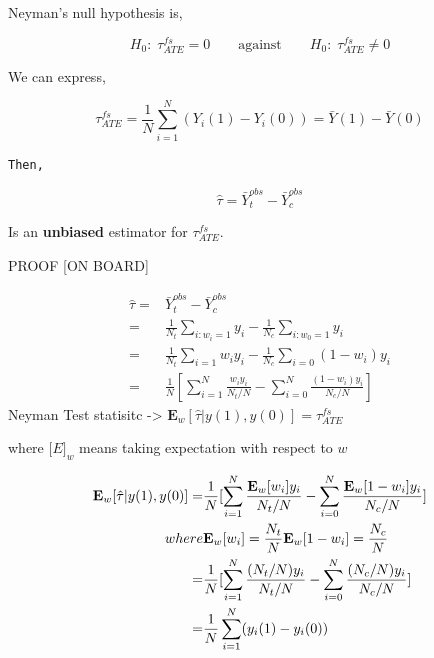 \documentclass[
  letterpaper,
  DIV=11,
  numbers=noendperiod]{scrreprt}
\theoremstyle{definition}
\theoremstyle{remark}
\begin{document}
Neyman's null hypothesis is,

\par

\[
H_0:\;\tau^{fs}_{ATE} = 0 \qquad\text{against}\qquad H_0:\;\tau^{fs}_{ATE} \neq 0
\]

We can express,

\[
        \tau^{fs}_{ATE} = \frac{1}{N}\sum_{i=1}^{N}(Y_i(1)-Y_i(0))=\bar{Y}(1)-\bar{Y}(0)
\]

\begin{verbatim}
Then, 
\end{verbatim}

\[
        \hat{\tau} = \bar{Y}^{obs}_t-\bar{Y}^{obs}_c
\]

Is an \textbf{unbiased} estimator for \(\tau^{fs}_{ATE}\).

PROOF {[}ON BOARD{]}

\begin{tcolorbox}[enhanced jigsaw, breakable, colframe=quarto-callout-important-color-frame, toptitle=1mm, toprule=.15mm, opacitybacktitle=0.6, opacityback=0, rightrule=.15mm, titlerule=0mm, colback=white, bottomtitle=1mm, title={Proofs}, arc=.35mm, coltitle=black, colbacktitle=quarto-callout-important-color!10!white, leftrule=.75mm, bottomrule=.15mm, left=2mm]

\[
\begin{aligned}
\hat{\tau} = &\bar{Y}^{obs}_t-\bar{Y}^{obs}_c \\
=&\frac{1}{N_t}\sum_{i:w_i=1}y_i-\frac{1}{N_c}\sum_{i:w_0=1}y_i \\
=&\frac{1}{N_t}\sum_{i=1}w_iy_i-\frac{1}{N_c}\sum_{i=0}(1-w_i)y_i \\
=&\frac{1}{N}[\sum_{i=1}^{N}\frac{w_iy_i}{N_t/N}-\sum_{i=0}^{N}\frac{(1-w_i)y_i}{N_c/N}]
\end{aligned}
\] Neyman Test statisitc -\textgreater{}
\(\mathbf{E}_w[\hat{\tau}|y(1),y(0)]=\tau_{ATE}^{fs}\)

where \(\mathbf[E]_w\) means taking expectation with respect to \(w\)

\[
\begin{aligned}
\mathbf{E}_w[\hat{\tau}|y(1),y(0)] = &\frac{1}{N}[\sum_{i=1}^{N}\frac{\mathbf{E}_w[w_i]y_i}{N_t/N}-\sum_{i=0}^{N}\frac{\mathbf{E}_w[1-w_i]y_i}{N_c/N}] \\
 where &\space \mathbf{E}_w[w_i]=\frac{N_t}{N} \space\space\space\space\space \mathbf{E}_w[1-w_i]=\frac{N_c}{N} \\
=&\frac{1}{N}[\sum_{i=1}^{N}\frac{(N_t/N)y_i}{N_t/N}-\sum_{i=0}^{N}\frac{(N_c/N)y_i}{N_c/N}] \\
=&\frac{1}{N}\sum_{i=1}^{N}(y_i(1)-y_i(0))
\end{aligned}
\]

\end{tcolorbox}
\end{document}

